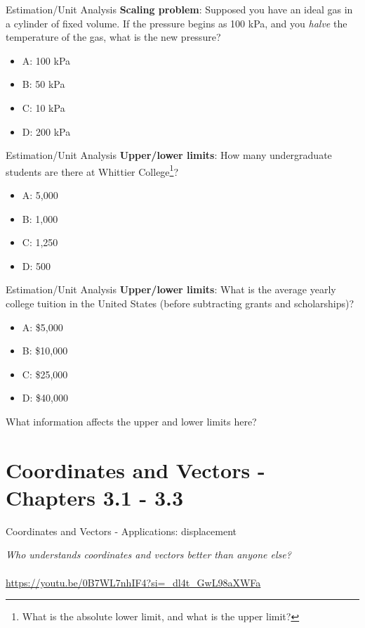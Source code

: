 \documentclass{beamer}
\begin{document}
\begin{frame}{Estimation/Unit Analysis}
\textbf{Scaling problem}: Supposed you have an ideal gas in a cylinder of fixed volume.  If the pressure begins as 100 kPa, and you \textit{halve} the temperature of the gas, what is the new pressure?
\begin{itemize}
\item A: 100 kPa
\item B: 50 kPa
\item C: 10 kPa
\item D: 200 kPa
\end{itemize}
\end{frame}

\begin{frame}{Estimation/Unit Analysis}
\textbf{Upper/lower limits}: How many undergraduate students are there at Whittier College\footnote{What is the absolute lower limit, and what is the upper limit?}?
\begin{itemize}
\item A: 5,000
\item B: 1,000
\item C: 1,250
\item D: 500
\end{itemize}
\end{frame}

\begin{frame}{Estimation/Unit Analysis}
\textbf{Upper/lower limits}: What is the average yearly college tuition in the United States (before subtracting grants and scholarships)?
\begin{itemize}
\item A: \$5,000
\item B: \$10,000
\item C: \$25,000
\item D: \$40,000
\end{itemize}
What information affects the \alert{upper} and \alert{lower} limits here?
\end{frame}

\section{Coordinates and Vectors - Chapters 3.1 - 3.3}

\begin{frame}{Coordinates and Vectors - Applications: displacement}
\begin{tcolorbox}[colback=white,colframe=gray,title=Activity Link]
\textit{Who understands coordinates and vectors better than anyone else?} \\ \\
\url{https://youtu.be/0B7WL7nhIF4?si=_dl4t_GwL98aXWFa}
\end{tcolorbox}
\end{frame}
\end{document}

